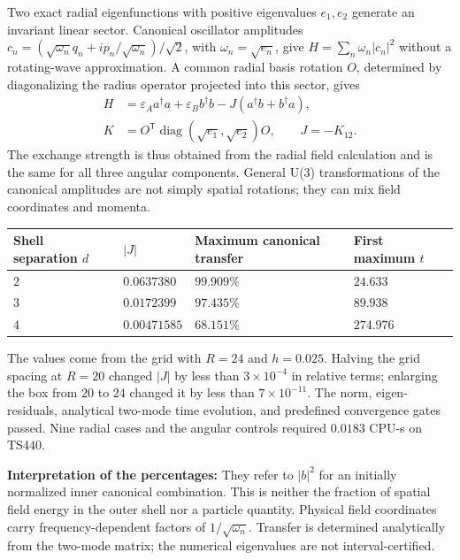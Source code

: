 \documentclass[a4paper,11pt]{article}
\newenvironment{drafttable}{\begin{center}\small\renewcommand{\arraystretch}{1.2}}{\end{center}}
\begin{document}
Two exact radial eigenfunctions with positive eigenvalues $e_1,e_2$ generate an invariant linear sector. Canonical oscillator amplitudes $c_n=(\sqrt{\omega_n}q_n+ip_n/\sqrt{\omega_n})/\sqrt2$, with $\omega_n=\sqrt{e_n}$, give $H=\sum_n\omega_n|c_n|^2$ without a rotating-wave approximation. A common radial basis rotation $O$, determined by diagonalizing the radius operator projected into this sector, gives
\begin{equation}
\begin{aligned}
H&=\varepsilon_Aa^\dagger a+\varepsilon_Bb^\dagger b-J(a^\dagger b+b^\dagger a),\\
K&=O^{\mathsf T}\operatorname{diag}(\sqrt{e_1},\sqrt{e_2})O,\qquad J=-K_{12}.
\end{aligned}\tag{12}
\end{equation}
The exchange strength is thus obtained from the radial field calculation and is the same for all three angular components. General U(3) transformations of the canonical amplitudes are not simply spatial rotations; they can mix field coordinates and momenta.

\begin{drafttable}
\begin{tabularx}{\linewidth}{@{}l l X l@{}}\toprule
Shell separation $d$ & $|J|$ & Maximum canonical transfer & First maximum $t$\\\midrule
$2$ & $0.0637380$ & $99.909\%$ & $24.633$\\
$3$ & $0.0172399$ & $97.435\%$ & $89.938$\\
$4$ & $0.00471585$ & $68.151\%$ & $274.976$\\\bottomrule
\end{tabularx}
\end{drafttable}
The values come from the grid with $R=24$ and $h=0.025$. Halving the grid spacing at $R=20$ changed $|J|$ by less than $3\times10^{-4}$ in relative terms; enlarging the box from $20$ to $24$ changed it by less than $7\times10^{-11}$. The norm, eigen-residuals, analytical two-mode time evolution, and predefined convergence gates passed. Nine radial cases and the angular controls required $0.0183$ CPU-s on TS440.

\textbf{Interpretation of the percentages:} They refer to $|b|^2$ for an initially normalized inner canonical combination. This is neither the fraction of spatial field energy in the outer shell nor a particle quantity. Physical field coordinates carry frequency-dependent factors of $1/\sqrt{\omega_n}$. Transfer is determined analytically from the two-mode matrix; the numerical eigenvalues are not interval-certified.
\end{document}
